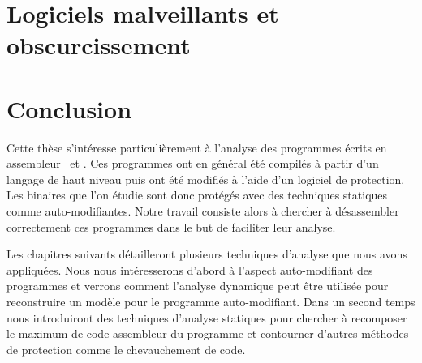 \section{Logiciels malveillants et obscurcissement}

\section{Conclusion}
Cette thèse s'intéresse particulièrement à l'analyse des programmes écrits en assembleur \xq\ et \xs. Ces programmes ont en général été compilés à partir d'un langage de haut niveau puis ont été modifiés à l'aide d'un logiciel de protection. Les binaires que l'on étudie sont donc protégés avec des techniques statiques comme auto-modifiantes. Notre travail consiste alors à chercher à désassembler correctement ces programmes dans le but de faciliter leur analyse.

Les chapitres suivants détailleront plusieurs techniques d'analyse que nous avons appliquées. Nous nous intéresserons d'abord à l'aspect auto-modifiant des programmes et verrons comment l'analyse dynamique peut être utilisée pour reconstruire un modèle pour le programme auto-modifiant. Dans un second temps nous introduiront des techniques d'analyse statiques pour chercher à recomposer le maximum de code assembleur du programme et contourner d'autres méthodes de protection comme le chevauchement de code.
